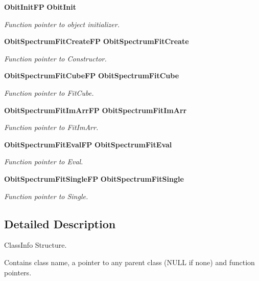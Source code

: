 \begin{CompactItemize}
{\bf Obit\-Init\-FP} {\bf Obit\-Init}
\begin{CompactList}\small\item\em Function pointer to object initializer. \item\end{CompactList}\item 
{\bf Obit\-Spectrum\-Fit\-Create\-FP} {\bf Obit\-Spectrum\-Fit\-Create}
\begin{CompactList}\small\item\em Function pointer to Constructor. \item\end{CompactList}\item 
{\bf Obit\-Spectrum\-Fit\-Cube\-FP} {\bf Obit\-Spectrum\-Fit\-Cube}
\begin{CompactList}\small\item\em Function pointer to Fit\-Cube. \item\end{CompactList}\item 
{\bf Obit\-Spectrum\-Fit\-Im\-Arr\-FP} {\bf Obit\-Spectrum\-Fit\-Im\-Arr}
\begin{CompactList}\small\item\em Function pointer to Fit\-Im\-Arr. \item\end{CompactList}\item 
{\bf Obit\-Spectrum\-Fit\-Eval\-FP} {\bf Obit\-Spectrum\-Fit\-Eval}
\begin{CompactList}\small\item\em Function pointer to Eval. \item\end{CompactList}\item 
{\bf Obit\-Spectrum\-Fit\-Single\-FP} {\bf Obit\-Spectrum\-Fit\-Single}
\begin{CompactList}\small\item\em Function pointer to Single. \item\end{CompactList}\end{CompactItemize}


\subsection{Detailed Description}
Class\-Info Structure. 

Contains class name, a pointer to any parent class (NULL if none) and function pointers. 



